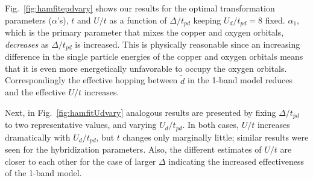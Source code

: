 Fig.~\ref{fig:hamfitepdvary} shows our results for the optimal 
transformation parameters ($\alpha$'s), $t$ and $U/t$ as a function of $\Delta/t_{pd}$
keeping $U_d/t_{pd}=8$ fixed. $\alpha_1$, which is the primary parameter that mixes 
the copper and oxygen orbitals, \textit{decreases} as $\Delta/t_{pd}$ is increased. 
This is physically reasonable since an increasing difference in the single particle energies of the copper and oxygen orbitals 
means that it is even more energetically unfavorable to occupy the oxygen orbitals. 
Correspondingly the effective hopping between $\tilde{d}$ in the 
1-band model reduces and the effective $U/t$ increases. 

Next, in Fig.~\ref{fig:hamfitUdvary} analogous results are presented by fixing $\Delta/t_{pd}$ 
to two representative values, and varying $U_d/t_{pd}$. In both cases, $U/t$ increases 
dramatically with $U_d/t_{pd}$, but $t$ changes only marginally little; 
similar results were seen for the hybridization parameters. 
Also, the different estimates of $U/t$ are closer to each other for the case of larger $\Delta$ 
indicating the increased effectiveness of the 1-band model. 

